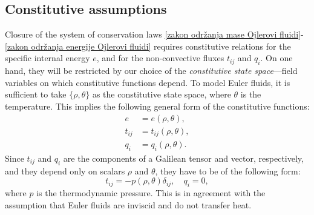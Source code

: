 \documentclass[a4paper,fleqn]{cas-sc}
\theoremstyle{definition}
\begin{document}
\subsection{Constitutive assumptions} 

Closure of the system of conservation laws \eqref{zakon održanja mase Ojlerovi fluidi}-\eqref{zakon održanja energije Ojlerovi fluidi} requires constitutive relations for the specific internal energy $e$, and for the non-convective fluxes $t_{ij}$ and $q_{i}$. On one hand, they will be restricted by our choice of the \emph{constitutive state space}---field variables on which constitutive functions depend. To model Euler fluids, it is sufficient to take $\{ \rho, \theta \}$ as the constitutive state space, where $\theta$ is the temperature. This implies the following general form of the constitutive functions: 
\begin{align} \label{KonstitutivneRelacije-Ojler}
	e & = e(\rho, \theta), 
	\nonumber \\
	t_{ij} & = t_{ij}(\rho, \theta), 
	\\ 
	q_{i} & = q_{i}(\rho, \theta). 
	\nonumber
\end{align}
Since $t_{ij}$ and $q_{i}$ are the components of a Galilean tensor and vector, respectively, and they depend only on scalars $\rho$ and $\theta$, they have to be of the following form:
\begin{equation} \label{KonstitutivneRelacije-Ojler2}
	t_{ij} = - p(\rho, \theta) \delta_{ij}, \quad q_{i} = 0,  
\end{equation}
where $p$ is the thermodynamic pressure. This is in agreement with the assumption that Euler fluids are inviscid and do not transfer heat. 
\end{document}
